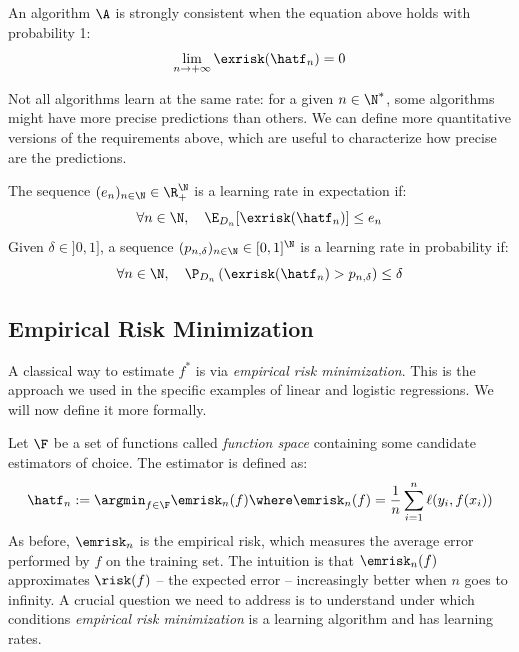 \documentclass[toc, titlepaged]{../cs-classes/cs-classes}
\begin{document}
\begin{definition}
    An algorithm $\A$ is strongly consistent when the equation above holds with probability 1:
    \begin{equation*}
        \lim_{n\to+\infty}\exrisk(\hatf_n)=0
    \end{equation*}
\end{definition}

Not all algorithms learn at the same rate: for a given $n\in\N^*$, some algorithms might have more precise predictions than others. We can define more quantitative versions of the requirements above, which are useful to characterize how precise are the predictions.
\begin{definition}
    The sequence $(e_n)_{n\in\N}\in\R_+^\N$ is a learning rate in expectation if:
    \begin{equation*}
        \forall n\in\N, \quad \E_{D_n}[\exrisk(\hatf_n)]\leq e_n
    \end{equation*}
    Given $\delta\in]0, 1]$, a sequence $(p_{n,\delta})_{n\in\N}\in[0, 1]^\N$ is a learning rate in probability if:
    \begin{equation*}
        \forall n\in\N, \quad \P_{D_n}\left(\exrisk(\hatf_n)>p_{n,\delta}\right)\leq\delta
    \end{equation*}
\end{definition}

\subsection{Empirical Risk Minimization}
A classical way to estimate $f^*$ is via \emph{empirical risk minimization}. This is the approach we used in the specific examples of linear and logistic regressions. We will now define it more formally.

Let $\F$ be a set of functions called \emph{function space} containing some candidate estimators of choice. The estimator is defined as:
\begin{equation*}
    \hatf_n := \argmin_{f\in\F} \emrisk_n(f) \where \emrisk_n(f) = \frac{1}{n}\sum_{i=1}^n\ell(y_i, f(x_i))
\end{equation*}
As before, $\emrisk_n$ is the empirical risk, which measures the average error performed by $f$ on the training set. The intuition is that $\emrisk_n(f)$ approximates $\risk(f)$ -- the expected error -- increasingly better when $n$ goes to infinity. A crucial question we need to address is to understand under which conditions \emph{empirical risk minimization} is a learning algorithm and has learning rates.
\end{document}
